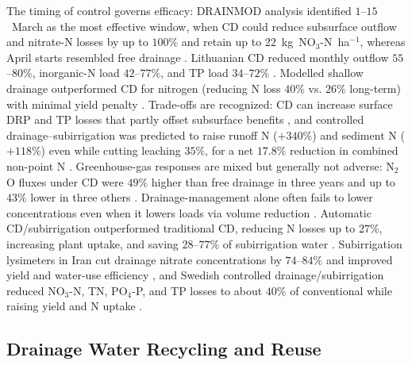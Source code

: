 \documentclass[11pt]{article}
\begin{document}
The timing of control governs efficacy: DRAINMOD analysis identified
$1$--$15$~March as the most effective window, when CD could reduce
subsurface outflow and nitrate-N losses by up to $100\%$ and retain up to
$22$~kg~NO$_3$-N~ha$^{-1}$, whereas April starts resembled free drainage
\parencite{Kesicka2023c}. Lithuanian CD reduced monthly outflow
$55$--$80\%$, inorganic-N load $42$--$77\%$, and TP load $34$--$72\%$
\parencite{Povilaitis2018}. Modelled shallow drainage outperformed CD for
nitrogen (reducing N loss $40\%$ vs. $26\%$ long-term) with minimal yield
penalty \parencite{Craft2018}. Trade-offs are recognized: CD can increase
surface DRP and TP losses that partly offset subsurface benefits
\parencite{King2022,Wu2025}, and controlled drainage--subirrigation was
predicted to raise runoff N ($+340\%$) and sediment N ($+118\%$) even while
cutting leaching $35\%$, for a net $17.8\%$ reduction in combined
non-point N \parencite{SHIRMOHAMMADI1995}. Greenhouse-gas responses are
mixed but generally not adverse: N$_2$O fluxes under CD were $49\%$ higher
than free drainage in three years and up to $43\%$ lower in three others
\parencite{Madramootoo2024}. Drainage-management alone often fails to lower
concentrations even when it lowers loads via volume reduction
\parencite{Grenon2023,Wesström2014}. Automatic CD/subirrigation
outperformed traditional CD, reducing N losses up to $27\%$, increasing
plant uptake, and saving $28$--$77\%$ of subirrigation water
\parencite{Abdelbaki2025}. Subirrigation lysimeters in Iran cut drainage
nitrate concentrations by $74$--$84\%$ and improved yield and water-use
efficiency \parencite{Noory2009}, and Swedish controlled drainage/subirrigation
reduced NO$_3$-N, TN, PO$_4$-P, and TP losses to about $40\%$ of
conventional while raising yield and N uptake \parencite{Wesström2014}.

\subsection{Drainage Water Recycling and Reuse}
\end{document}
